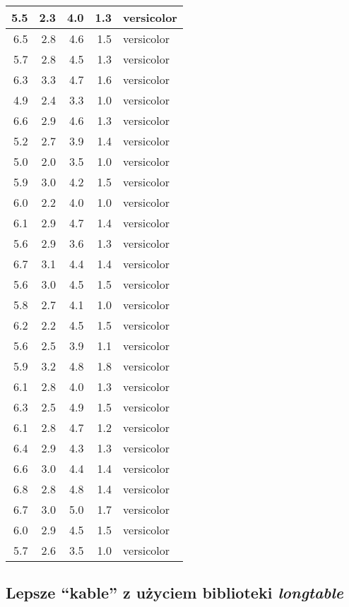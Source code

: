 \documentclass[a4paper, 10pt]{article}\usepackage[]{graphicx}\usepackage[]{color}
\begin{document}
\begin{tabular}{r|r|r|r|l}
\hline
5.5 & 2.3 & 4.0 & 1.3 & versicolor\\
\hline
6.5 & 2.8 & 4.6 & 1.5 & versicolor\\
\hline
5.7 & 2.8 & 4.5 & 1.3 & versicolor\\
\hline
6.3 & 3.3 & 4.7 & 1.6 & versicolor\\
\hline
4.9 & 2.4 & 3.3 & 1.0 & versicolor\\
\hline
6.6 & 2.9 & 4.6 & 1.3 & versicolor\\
\hline
5.2 & 2.7 & 3.9 & 1.4 & versicolor\\
\hline
5.0 & 2.0 & 3.5 & 1.0 & versicolor\\
\hline
5.9 & 3.0 & 4.2 & 1.5 & versicolor\\
\hline
6.0 & 2.2 & 4.0 & 1.0 & versicolor\\
\hline
6.1 & 2.9 & 4.7 & 1.4 & versicolor\\
\hline
5.6 & 2.9 & 3.6 & 1.3 & versicolor\\
\hline
6.7 & 3.1 & 4.4 & 1.4 & versicolor\\
\hline
5.6 & 3.0 & 4.5 & 1.5 & versicolor\\
\hline
5.8 & 2.7 & 4.1 & 1.0 & versicolor\\
\hline
6.2 & 2.2 & 4.5 & 1.5 & versicolor\\
\hline
5.6 & 2.5 & 3.9 & 1.1 & versicolor\\
\hline
5.9 & 3.2 & 4.8 & 1.8 & versicolor\\
\hline
6.1 & 2.8 & 4.0 & 1.3 & versicolor\\
\hline
6.3 & 2.5 & 4.9 & 1.5 & versicolor\\
\hline
6.1 & 2.8 & 4.7 & 1.2 & versicolor\\
\hline
6.4 & 2.9 & 4.3 & 1.3 & versicolor\\
\hline
6.6 & 3.0 & 4.4 & 1.4 & versicolor\\
\hline
6.8 & 2.8 & 4.8 & 1.4 & versicolor\\
\hline
6.7 & 3.0 & 5.0 & 1.7 & versicolor\\
\hline
6.0 & 2.9 & 4.5 & 1.5 & versicolor\\
\hline
5.7 & 2.6 & 3.5 & 1.0 & versicolor\\
\hline
\end{tabular}



\subsection{Lepsze ``kable'' z użyciem biblioteki \emph{longtable}}
\end{document}
